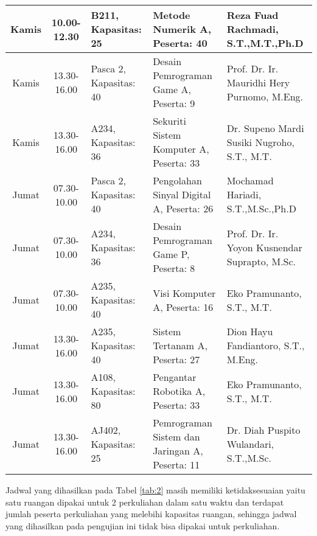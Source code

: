 \begin{longtable}[c]{|c|c|>{\centering\arraybackslash}m{2.5cm}|>{\centering\arraybackslash}m{4cm}|>{\centering\arraybackslash}m{3cm}|}
  Kamis  & 10.00-12.30 & B211, Kapasitas: 25    & Metode Numerik A, \linebreak Peserta: 40                            & Reza Fuad Rachmadi, S.T.,M.T.,Ph.D            \\ \hline
  Kamis  & 13.30-16.00 & Pasca 2, Kapasitas: 40 & Desain Pemrograman Game A, \linebreak Peserta: 9                    & Prof. Dr. Ir. Mauridhi Hery Purnomo, M.Eng.   \\ \hline
  Kamis  & 13.30-16.00 & A234, Kapasitas: 36    & Sekuriti Sistem Komputer A, \linebreak Peserta: 33                  & Dr. Supeno Mardi Susiki Nugroho, S.T., M.T.   \\ \hline
  Jumat  & 07.30-10.00 & Pasca 2, Kapasitas: 40 & Pengolahan Sinyal Digital A, \linebreak Peserta: 26                 & Mochamad Hariadi, S.T.,M.Sc.,Ph.D             \\ \hline
  Jumat  & 07.30-10.00 & A234, Kapasitas: 36    & Desain Pemrograman Game P, \linebreak Peserta: 8                    & Prof. Dr. Ir. Yoyon Kusnendar Suprapto, M.Sc. \\ \hline
  Jumat  & 07.30-10.00 & A235, Kapasitas: 40    & Visi Komputer A, \linebreak Peserta: 16                             & Eko Pramunanto, S.T., M.T.                    \\ \hline
  Jumat  & 13.30-16.00 & A235, Kapasitas: 40    & Sistem Tertanam A, \linebreak Peserta: 27                           & Dion Hayu Fandiantoro, S.T., M.Eng.           \\ \hline
  Jumat  & 13.30-16.00 & A108, Kapasitas: 80    & Pengantar Robotika A, \linebreak Peserta: 33                        & Eko Pramunanto, S.T., M.T.                    \\ \hline
  Jumat  & 13.30-16.00 & AJ402, Kapasitas: 25   & Pemrograman Sistem dan Jaringan A, \linebreak Peserta: 11           & Dr. Diah Puspito Wulandari, S.T.,M.Sc.        \\ \hline
  \end{longtable}
Jadwal yang dihasilkan pada Tabel \ref{tab:2} masih memiliki ketidaksesuaian yaitu satu ruangan dipakai untuk 2 perkuliahan dalam satu waktu dan terdapat jumlah peserta perkuliahan yang melebihi kapasitas ruangan, sehingga jadwal yang dihasilkan pada pengujian ini tidak bisa dipakai untuk perkuliahan.  

